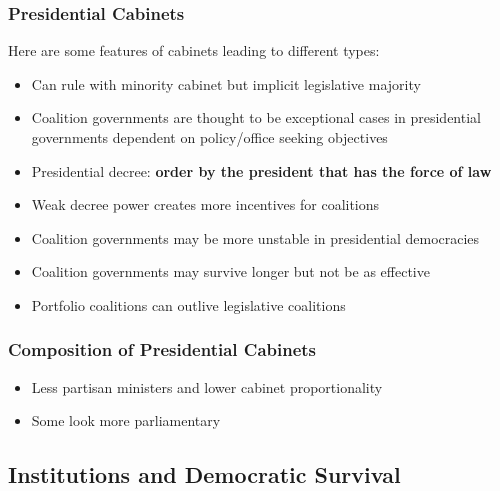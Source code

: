 \documentclass[12pt, letterpaper]{article}
\begin{document}
\subsubsection{Presidential Cabinets}
Here are some features of cabinets leading to different types:
\begin{itemize}
	\item Can rule with minority cabinet but implicit legislative majority
	\item Coalition governments are thought to be exceptional cases in presidential governments dependent on policy/office seeking objectives
	\item Presidential decree: \textbf{order by the president that has the force of law}
	\item Weak decree power creates more incentives for coalitions
	\item Coalition governments may be more unstable in presidential democracies
	\item Coalition governments may survive longer but not be as effective
	\item Portfolio coalitions can outlive legislative coalitions
\end{itemize}

\subsubsection{Composition of Presidential Cabinets}
\begin{itemize}
	\item Less partisan ministers and lower cabinet proportionality
	\item Some look more parliamentary
\end{itemize}

\subsection{Institutions and Democratic Survival}
\end{document}
